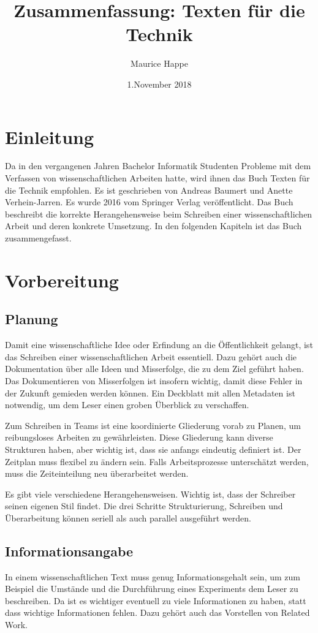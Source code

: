 \documentclass{article}
\title{Zusammenfassung: Texten für die Technik}
\author{Maurice Happe}
\date{1.November 2018}
\begin{document}
\onehalfspacing
\maketitle

\section{Einleitung}
Da in den vergangenen Jahren Bachelor Informatik Studenten Probleme mit dem Verfassen von wissenschaftlichen Arbeiten hatte, wird ihnen das Buch \glqq Texten für die Technik\grqq{}  empfohlen. Es ist geschrieben von Andreas Baumert und Anette Verhein-Jarren. Es wurde 2016 vom Springer Verlag veröffentlicht.
Das Buch beschreibt die korrekte Herangehensweise beim Schreiben einer wissenschaftlichen Arbeit und deren konkrete Umsetzung.
In den folgenden Kapiteln ist das Buch zusammengefasst.
\section{Vorbereitung}
\subsection{Planung}
Damit eine wissenschaftliche Idee oder Erfindung an die Öffentlichkeit gelangt, ist das Schreiben einer wissenschaftlichen Arbeit essentiell.
Dazu gehört auch die Dokumentation über alle Ideen und Misserfolge, die zu dem Ziel geführt haben. Das Dokumentieren von Misserfolgen ist insofern wichtig, damit diese Fehler in der Zukunft gemieden werden können.
Ein Deckblatt mit allen Metadaten ist notwendig, um dem Leser einen groben Überblick zu verschaffen.

Zum Schreiben in Teams ist eine koordinierte Gliederung vorab zu Planen, um reibungsloses Arbeiten zu gewährleisten. Diese Gliederung kann diverse Strukturen haben, aber wichtig ist, dass sie anfangs eindeutig definiert ist.
Der Zeitplan muss flexibel zu ändern sein. Falls Arbeitsprozesse unterschätzt werden, muss die Zeiteinteilung neu überarbeitet werden.

Es gibt viele verschiedene Herangehensweisen. Wichtig ist, dass der Schreiber seinen eigenen Stil findet. Die drei Schritte \glqq Strukturierung, Schreiben und Überarbeitung\grqq{} können seriell als auch parallel ausgeführt werden.

\subsection{Informationsangabe}
In einem wissenschaftlichen Text muss genug Informationsgehalt sein, um zum Beispiel die Umstände und die Durchführung eines Experiments dem Leser zu beschreiben. Da ist es wichtiger eventuell zu viele Informationen zu haben, statt dass wichtige Informationen fehlen. Dazu gehört auch das Vorstellen von Related Work. 
\end{document}
